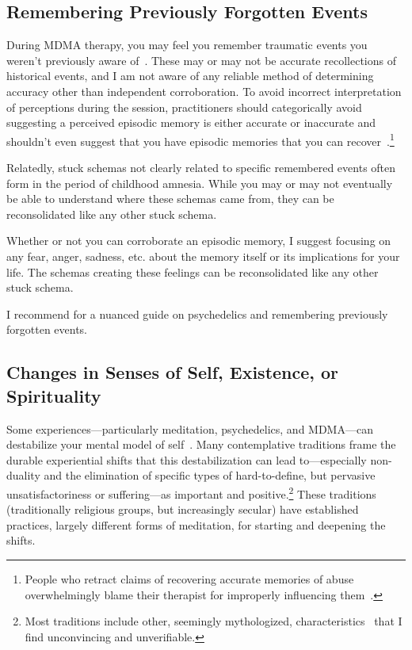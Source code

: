 \documentclass[11pt,oneside]{book}
\let\cite\parencite
\begin{document}
\subsection{Remembering Previously Forgotten Events}
\label{navigating}
During MDMA therapy, you may feel you remember traumatic events you weren't previously aware of~\cite{psychedelicrecoveredmemory}. These may or may not be accurate recollections of historical events, and I am not aware of any reliable method of determining accuracy other than independent corroboration. To avoid incorrect interpretation of perceptions during the session, practitioners should categorically avoid suggesting a perceived episodic memory is either accurate or inaccurate and shouldn't even suggest that you have episodic memories that you can recover~\cite{otgaarMemory}.\footnote{People who retract claims of recovering accurate memories of abuse overwhelmingly blame their therapist for improperly influencing them~\cite{otgaarMemory}.}

Relatedly, stuck schemas not clearly related to specific remembered events often form in the period of childhood amnesia. While you may or may not eventually be able to understand where these schemas came from, they can be reconsolidated like any other stuck schema.

Whether or not you can corroborate an episodic memory, I suggest focusing on any fear, anger, sadness, etc. about the memory itself or its implications for your life. The schemas creating these feelings can be reconsolidated like any other stuck schema.

I recommend \textcite{psychedelicrecoveredmemory} for a nuanced guide on psychedelics and remembering previously forgotten events.

\subsection{Changes in Senses of Self, Existence, or Spirituality}
\label{selfinsight}
Some experiences---particularly meditation, psychedelics, and MDMA---can destabilize your mental model of self~\cite{ingramMDMA,ingram2018mastering}. Many contemplative traditions frame the durable experiential shifts that this destabilization can lead to---especially non-duality and the elimination of specific types of hard-to-define, but pervasive unsatisfactoriness or suffering---as important and positive.\footnote{Most traditions include other, seemingly mythologized, characteristics~\cite{ingram2018mastering} that I find unconvincing and unverifiable.} These traditions (traditionally religious groups, but increasingly secular) have established practices, largely different forms of meditation, for starting and deepening the shifts.
\end{document}
